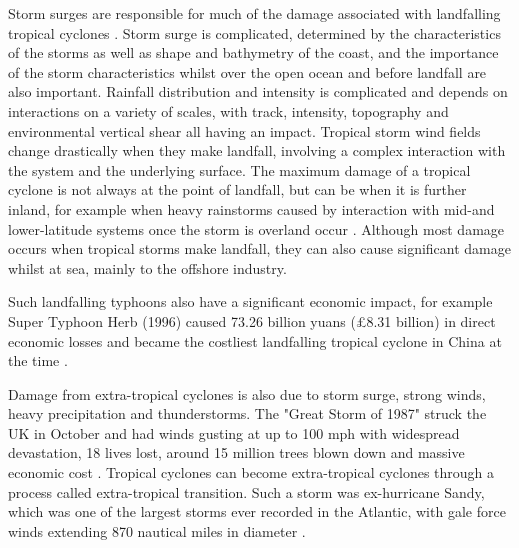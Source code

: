 Storm surges are responsible for much of the damage associated with landfalling tropical cyclones \citep{lin2012physically}. Storm surge is complicated, determined by the characteristics of the storms as well as shape and bathymetry of the coast, and the importance of the storm characteristics whilst over the open ocean and before landfall are also important. Rainfall distribution and intensity is complicated and depends on interactions on a variety of scales, with track, intensity, topography and environmental vertical shear all having an impact. Tropical storm wind fields change drastically when they make landfall, involving a complex interaction with the system and the underlying surface. The maximum damage of a tropical cyclone is not always at the point of landfall, but can be when it is further inland, for example when heavy rainstorms caused by interaction with mid-and lower-latitude systems once the storm is overland occur \citep{xiao2013analysis}. Although most damage occurs when tropical storms make landfall, they can also cause significant damage whilst at sea, mainly to the offshore industry.


Such landfalling typhoons also have a significant economic impact, for example Super Typhoon Herb (1996) caused 73.26 billion yuans  (£8.31 billion) in direct economic losses and became the costliest landfalling tropical cyclone in China at the time \citep{zhang2009tropical}.

Damage from extra-tropical cyclones is also due to storm surge, strong winds, heavy precipitation and thunderstorms. The "Great Storm of 1987" struck the UK in October and had winds gusting at up to 100 mph with widespread devastation, 18 lives lost, around 15 million trees blown down and massive economic cost \citet{GreatStorm}. Tropical cyclones can become extra-tropical cyclones through a process called extra-tropical transition. Such a storm was ex-hurricane Sandy, which was one of the largest storms ever recorded in the Atlantic, with gale force winds extending 870 nautical miles in diameter \citet{blake2013tropical}. 

